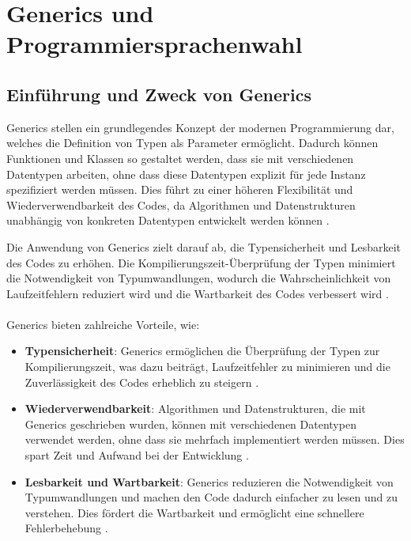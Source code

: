 \documentclass{easychair}
\begin{document}
\section{Generics und Programmiersprachenwahl}

\subsection{Einführung und Zweck von Generics}

Generics stellen ein grundlegendes Konzept der modernen Programmierung dar, welches die Definition von Typen als Parameter ermöglicht. Dadurch können Funktionen und Klassen so gestaltet werden, dass sie mit verschiedenen Datentypen arbeiten, ohne dass diese Datentypen explizit für jede Instanz spezifiziert werden müssen. Dies führt zu einer höheren Flexibilität und Wiederverwendbarkeit des Codes, da Algorithmen und Datenstrukturen unabhängig von konkreten Datentypen entwickelt werden können \cite{torgersen2004expression}.

Die Anwendung von Generics zielt darauf ab, die Typensicherheit und Lesbarkeit des Codes zu erhöhen. Die Kompilierungszeit-Überprüfung der Typen minimiert die Notwendigkeit von Typumwandlungen, wodurch die Wahrscheinlichkeit von Laufzeitfehlern reduziert wird und die Wartbarkeit des Codes verbessert wird \cite{hughes1989functional}.\\\\
Generics bieten zahlreiche Vorteile, wie:

\begin{itemize}
  \item \textbf{Typensicherheit}: Generics ermöglichen die Überprüfung der Typen zur Kompilierungszeit, was dazu beiträgt, Laufzeitfehler zu minimieren und die Zuverlässigkeit des Codes erheblich zu steigern \cite{wadler1998expression}.
  \item \textbf{Wiederverwendbarkeit}: Algorithmen und Datenstrukturen, die mit Generics geschrieben wurden, können mit verschiedenen Datentypen verwendet werden, ohne dass sie mehrfach implementiert werden müssen. Dies spart Zeit und Aufwand bei der Entwicklung \cite{torgersen2004expression}.
  \item \textbf{Lesbarkeit und Wartbarkeit}: Generics reduzieren die Notwendigkeit von Typumwandlungen und machen den Code dadurch einfacher zu lesen und zu verstehen. Dies fördert die Wartbarkeit und ermöglicht eine schnellere Fehlerbehebung \cite{wadler1998expression}.
\end{itemize}
\end{document}
